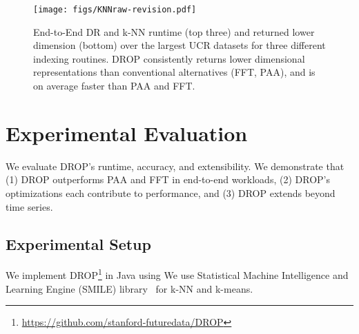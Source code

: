 
\begin{figure*}[t!]
\texttt{[image: figs/KNNraw-revision.pdf]}
\caption[]{End-to-End DR and k-NN runtime (top three) and returned lower dimension (bottom) over the largest UCR datasets for three different indexing routines. DROP consistently returns lower dimensional representations than conventional alternatives (FFT, PAA), and is on average faster than PAA and FFT.}
\label{fig:knnAll}
\end{figure*}

\section{Experimental Evaluation}
\label{sec:experiments}

We evaluate DROP's runtime, accuracy, and extensibility. We demonstrate that (1) DROP outperforms PAA and FFT in end-to-end workloads, (2) DROP's optimizations each contribute to performance,  and (3) DROP extends beyond time series.

\begin{comment}
\begin{enumerate}[itemsep=0.5em]
\item{DROP outperforms PAA and FFT in end-to-end, repetitive-query workloads (\S\ref{subsec:runtime}).}	
\item{DROP's optimizations for sampling, downstream task and work reuse contribute to performance (\S\ref{subsec:lesion}).}
\item{DROP's DR runtime scales with intrinsic dimensionality, independently of data size (\S\ref{subsec:scale}).}
\item{DROP extends beyond our time series case study (\S\ref{subsec:nonts}).}	
\end{enumerate}
\end{comment}

\subsection{Experimental Setup}
\label{subsec:setup}
 We implement DROP\footnote{\href{https://github.com/stanford-futuredata/DROP}{https://github.com/stanford-futuredata/DROP}} in Java using 
We use  Statistical Machine Intelligence and Learning Engine (SMILE) library~\cite{smile} for k-NN {and k-means}. 

